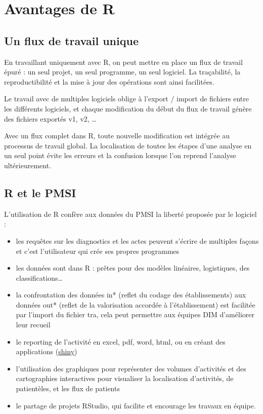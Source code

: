 \documentclass[]{book}
\providecommand{\tightlist}{%
  \setlength{\itemsep}{0pt}\setlength{\parskip}{0pt}}
\begin{document}
\section{Avantages de R}\label{avantages-de-r}

\subsection{Un flux de travail unique}\label{un-flux-de-travail-unique}

En travaillant uniquement avec R, on peut mettre en place un flux de
travail épuré : un seul projet, un seul programme, un seul logiciel. La
traçabilité, la reproductibilité et la mise à jour des opérations sont
ainsi facilitées.

Le travail avec de multiples logiciels oblige à l'export / import de
fichiers entre les différents logiciels, et chaque modification du début
du flux de travail génère des fichiers exportés v1, v2, \ldots{}

Avec un flux complet dans R, toute nouvelle modification est intégrée au
processus de travail global. La localisation de toutes les étapes d'une
analyse en un seul point évite les erreurs et la confusion lorsque l'on
reprend l'analyse ultérieurement.

\subsection{R et le PMSI}\label{r-et-le-pmsi}

L'utilisation de R confère aux données du PMSI la liberté proposée par
le logiciel :

\begin{itemize}
\tightlist
\item
  les requêtes sur les diagnostics et les actes peuvent s'écrire de
  multiples façons et c'est l'utilisateur qui crée ses propres
  programmes
\item
  les données sont dans R : prêtes pour des modèles linéaires,
  logistiques, des classifications\ldots{}
\item
  la confrontation des données in* (reflet du codage des établissements)
  aux données out* (reflet de la valorisation accordée à
  l'établissement) est facilitée par l'import du fichier tra, cela peut
  permettre aux équipes DIM d'améliorer leur recueil
\item
  le reporting de l'activité en excel, pdf, word, html, ou en créant des
  applications (\href{http://shiny.rstudio.com}{shiny})
\item
  l'utilisation des graphiques pour représenter des volumes d'activités
  et des cartographies interactives pour visualiser la localisation
  d'activités, de patientèles, et les flux de patients
\item
  le partage de projets RStudio, qui facilite et encourage les travaux
  en équipe.
\end{itemize}
\end{document}

